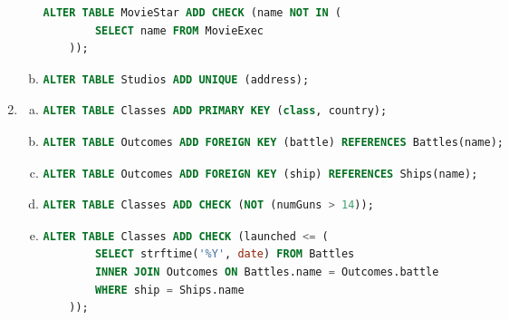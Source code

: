 \documentclass[12pt]{article}
\begin{document}
\begin{enumerate}[1.]
\begin{enumerate}[a)]
\begin{lstlisting}[language=SQL]
    ALTER TABLE MovieStar ADD CHECK (name NOT IN (
        SELECT name FROM MovieExec
    ));
    \end{lstlisting}

        \item

    \begin{lstlisting}[language=SQL]
    ALTER TABLE Studios ADD UNIQUE (address);
    \end{lstlisting}

    \end{enumerate}

    \item

    \begin{enumerate}[a)]
        \item

    \begin{lstlisting}[language=SQL]
    ALTER TABLE Classes ADD PRIMARY KEY (class, country);
    \end{lstlisting}

        \item

    \begin{lstlisting}[language=SQL]
    ALTER TABLE Outcomes ADD FOREIGN KEY (battle) REFERENCES Battles(name);
    \end{lstlisting}

        \item

    \begin{lstlisting}[language=SQL]
    ALTER TABLE Outcomes ADD FOREIGN KEY (ship) REFERENCES Ships(name);
    \end{lstlisting}

        \item

    \begin{lstlisting}[language=SQL]
    ALTER TABLE Classes ADD CHECK (NOT (numGuns > 14));
    \end{lstlisting}

        \item

    \begin{lstlisting}[language=SQL]
    ALTER TABLE Classes ADD CHECK (launched <= (
        SELECT strftime('%Y', date) FROM Battles
        INNER JOIN Outcomes ON Battles.name = Outcomes.battle
        WHERE ship = Ships.name
    ));
    \end{lstlisting}


\end{enumerate}
\end{enumerate}
\end{document}
